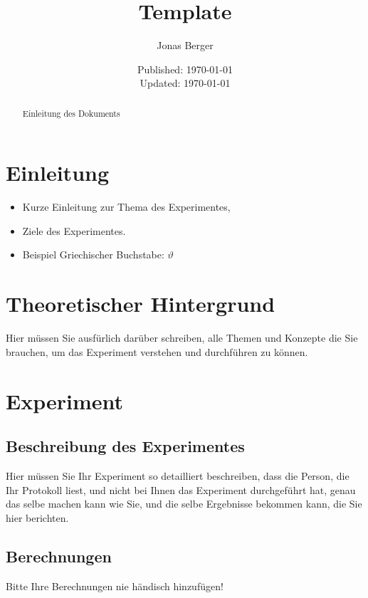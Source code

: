 \documentclass[12pt,a4paper]{article}
\title{Template}
\author{Jonas Berger}
\date{Published: \today \\ Updated: \today}
\begin{document}
\maketitle
\thispagestyle{empty}
\pagebreak

\renewcommand{\abstractname}{Abstract} %
\begin{abstract} %
	\noindent
	Einleitung des Dokuments
\end{abstract}

\tableofcontents
\pagebreak

\section{Einleitung}

\begin{itemize}
	\item Kurze Einleitung zur Thema des Experimentes,
	\item Ziele des Experimentes.
	\item Beispiel Griechischer Buchstabe: $\vartheta$
\end{itemize}

\section{Theoretischer Hintergrund}
Hier müssen Sie ausfürlich darüber schreiben, alle 
Themen und Konzepte die Sie brauchen, um das 
Experiment verstehen und durchführen zu können.

\section{Experiment}
\label{sec:Experiment}

	\subsection{Beschreibung des Experimentes}
	Hier müssen Sie Ihr Experiment so detailliert beschreiben, 
	dass die Person, die Ihr Protokoll liest, und nicht bei Ihnen 
	das Experiment durchgeführt hat, genau das selbe 
	machen kann wie Sie, und die selbe Ergebnisse bekommen 
	kann, die Sie hier berichten.

	\subsection{Berechnungen}
	Bitte Ihre Berechnungen nie händisch hinzufügen!
	
\end{document}
